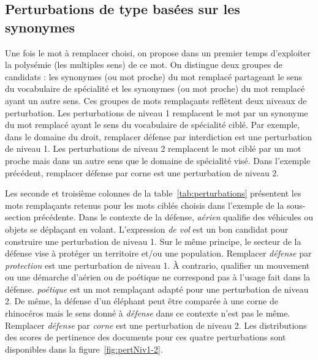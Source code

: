     \subsection{Perturbations de type \replace basées sur les synonymes}


        Une fois le mot à remplacer choisi, on propose dans un premier temps d'exploiter la polysémie (les multiples sens) de ce mot. On distingue deux groupes de candidats : les synonymes (ou mot proche) du mot remplacé partageant le sens du vocabulaire de spécialité et les synonymes (ou mot proche) du mot remplacé ayant un autre sens. Ces groupes de mots remplaçants reflètent deux niveaux de perturbation. Les perturbations de niveau 1 remplacent le mot par un synonyme du mot remplacé ayant le sens du vocabulaire de spécialité ciblé. Par exemple, dans le domaine du droit, remplacer défense par interdiction est une perturbation de niveau 1. Les perturbations de niveau 2 remplacent le mot ciblé par un mot proche mais dans un autre sens que le domaine de spécialité visé. Dans l'exemple précédent, remplacer défense par corne est une perturbation de niveau 2. 

        Les seconde et troisième colonnes de la table~\ref{tab:perturbations} présentent les mots remplaçants retenus pour les mots ciblés choisis dans l'exemple de la sous-section précédente. Dans le contexte de la défense, \textit{aérien} qualifie des véhicules ou objets se déplaçant en volant. L'expression \textit{de vol} est un bon candidat pour construire une perturbation de niveau 1. Sur le même principe, le secteur de la défense vise à protéger un territoire et/ou une population.  Remplacer \textit{défense} par \textit{protection} est une perturbation de niveau 1.  À contrario, qualifier un mouvement ou une démarche d'aérien ou de poétique ne correspond pas à l'usage fait dans la défense. \textit{poétique} est un mot remplaçant adapté pour une perturbation de niveau 2. De même, la défense d'un éléphant peut être comparée à une corne de rhinocéros mais le sens donné à \textit{défense} dans ce contexte n'est pas le même. Remplacer \textit{défense} par \textit{corne} est une perturbation de niveau 2. Les distributions des scores de pertinence des documents pour ces quatre perturbations sont disponibles dans la figure~\ref{fig:pertNiv1-2}.

